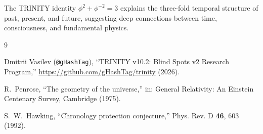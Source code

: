 \documentclass[12pt,a4paper]{article}
\begin{document}
The TRINITY identity $\phi^2 + \phi^{-2} = 3$ explains the three-fold temporal structure of past, present, and future, suggesting deep connections between time, consciousness, and fundamental physics.

\begin{thebibliography}{9}

Dmitrii Vasilev (\texttt{@gHashTag}),
``TRINITY v10.2: Blind Spots v2 Research Program,''
\url{https://github.com/gHashTag/trinity} (2026).

R.~Penrose,
``The geometry of the universe,''
in: General Relativity: An Einstein Centenary Survey, Cambridge (1975).

S.~W.~Hawking,
``Chronology protection conjecture,''
Phys. Rev. D \textbf{46}, 603 (1992).

\end{thebibliography}
\end{document}

